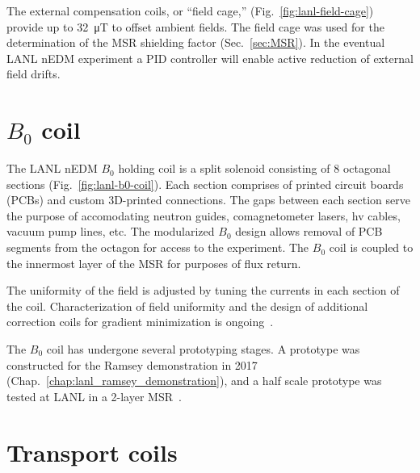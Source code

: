 The external compensation coils, or ``field cage,'' (Fig.~\ref{fig:lanl-field-cage}) provide up to \qty{32}{\micro\tesla} to offset ambient fields. The field cage was used for the determination of the MSR shielding factor (Sec.~\ref{sec:MSR}). In the eventual LANL nEDM experiment a PID controller will enable active reduction of external field drifts.


\section{
    \texorpdfstring{$B_0$ coil}
                {B0 coil}\label{sec:B0_coil}
}


The LANL nEDM $B_0$ holding coil is a split solenoid consisting of 8 octagonal sections (Fig.~\ref{fig:lanl-b0-coil}). Each section comprises of printed circuit boards (PCBs) and custom 3D-printed connections. The gaps between each section serve the purpose of accomodating neutron guides, comagnetometer lasers, \acrshort*{hv} cables, vacuum pump lines, etc. The modularized $B_0$ design allows removal of PCB segments from the octagon for access to the experiment. The $B_0$ coil is coupled to the innermost layer of the MSR for purposes of flux return. 

The uniformity of the field is adjusted by tuning the currents in each section of the coil. Characterization of field uniformity and the design of additional correction coils for gradient minimization is ongoing~.

The $B_0$ coil has undergone several prototyping stages. A prototype was constructed for the Ramsey demonstration in 2017 (Chap.~\ref{chap:lanl_ramsey_demonstration}), and a half scale prototype was tested at LANL in a 2-layer MSR~.


\section{Transport coils}


